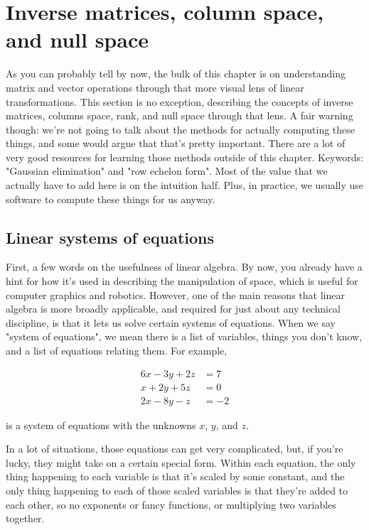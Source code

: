 \section{Inverse matrices, column space, and null space}

As you can probably tell by now, the bulk of this chapter is on understanding
matrix and vector operations through that more visual lens of linear
transformations. This section is no exception, describing the concepts of
inverse matrices, columns space, rank, and null space through that lens. A fair
warning though: we're not going to talk about the methods for actually computing
these things, and some would argue that that's pretty important. There are a lot
of very good resources for learning those methods outside of this chapter.
Keywords: "Gaussian elimination" and "row echelon form". Most of the value that
we actually have to add here is on the intuition half. Plus, in practice, we
usually use software to compute these things for us anyway.

\subsection{Linear systems of equations}

First, a few words on the usefulness of linear algebra. By now, you already have
a hint for how it's used in describing the manipulation of space, which is
useful for computer graphics and robotics. However, one of the main reasons that
linear algebra is more broadly applicable, and required for just about any
technical discipline, is that it lets us solve certain systems of equations.
When we say "system of equations", we mean there is a list of variables, things
you don't know, and a list of equations relating them. For example,

\begin{align*}
  6x - 3y + 2z &= 7 \\
  x + 2y + 5z &= 0 \\
  2x - 8y - z &= -2
\end{align*}

is a system of equations with the unknowns $x$, $y$, and $z$.

In a lot of situations, those equations can get very complicated, but, if you're
lucky, they might take on a certain special form. Within each equation, the only
thing happening to each variable is that it's scaled by some constant, and the
only thing happening to each of those scaled variables is that they're added to
each other, so no exponents or fancy functions, or multiplying two variables
together.

